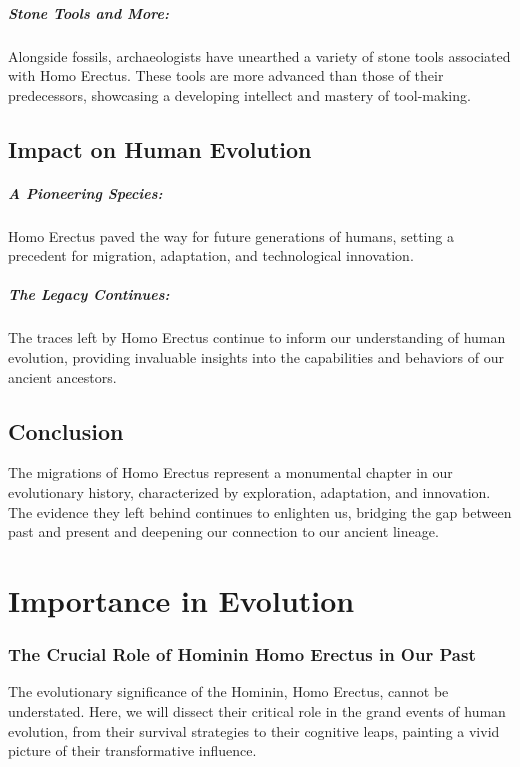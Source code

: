 \documentclass[a4paper,12pt]{book}
\begin{document}
\paragraph{Stone Tools and More:}
Alongside fossils, archaeologists have unearthed a variety of stone tools associated with Homo Erectus. These tools are more advanced than those of their predecessors, showcasing a developing intellect and mastery of tool-making.

\section*{Impact on Human Evolution}

\paragraph{A Pioneering Species:}
Homo Erectus paved the way for future generations of humans, setting a precedent for migration, adaptation, and technological innovation. 

\paragraph{The Legacy Continues:}
The traces left by Homo Erectus continue to inform our understanding of human evolution, providing invaluable insights into the capabilities and behaviors of our ancient ancestors.

\section*{Conclusion}

The migrations of Homo Erectus represent a monumental chapter in our evolutionary history, characterized by exploration, adaptation, and innovation. The evidence they left behind continues to enlighten us, bridging the gap between past and present and deepening our connection to our ancient lineage.

\chapter{Importance in Evolution}
\subsection*{The Crucial Role of Hominin Homo Erectus in Our Past}
The evolutionary significance of the Hominin, Homo Erectus, cannot be understated. Here, we will dissect their critical role in the grand events of human evolution, from their survival strategies to their cognitive leaps, painting a vivid picture of their transformative influence.
\end{document}
